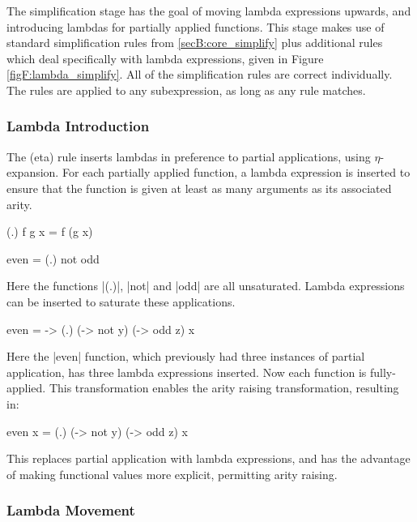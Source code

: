 The simplification stage has the goal of moving lambda expressions upwards, and introducing lambdas for partially applied functions. This stage makes use of standard simplification rules from \ref{secB:core_simplify} plus additional rules which deal specifically with lambda expressions, given in Figure \ref{figF:lambda_simplify}. All of the simplification rules are correct individually. The rules are applied to any subexpression, as long as any rule matches.

\subsubsection{Lambda Introduction}

The (eta) rule inserts lambdas in preference to partial applications, using $\eta$-expansion. For each partially applied function, a lambda expression is inserted to ensure that the function is given at least as many arguments as its associated arity.

\begin{example}
\ignore\begin{code}
(.) f g x = f (g x)

even = (.) not odd
\end{code}

\noindent Here the functions |(.)|, |not| and |odd| are all unsaturated. Lambda expressions can be inserted to saturate these applications.

\begin{code}
even = \x -> (.) (\y -> not y) (\z -> odd z) x
\end{code}

\noindent Here the |even| function, which previously had three instances of partial application, has three lambda expressions inserted. Now each function is fully-applied. This transformation enables the arity raising transformation, resulting in:

\begin{code}
even x = (.) (\y -> not y) (\z -> odd z) x
\end{code}
\end{example}

This replaces partial application with lambda expressions, and has the advantage of making functional values more explicit, permitting arity raising.

\subsubsection{Lambda Movement}
\label{secF:sharing}

